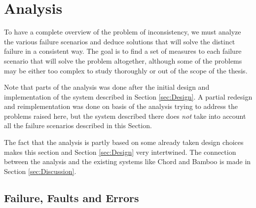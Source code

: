 \section{Analysis}
\label{sec:Analysis}


To have a complete overview of the problem of inconsistency, we must analyze the
 various failure scenarios and deduce solutions that will solve the distinct failure
 in a consistent way. The goal is to find a set of measures to each failure scenario
 that will solve the problem altogether, although some of the problems may be either
 too complex to study thoroughly or out of the scope of the thesis.

Note that parts of the analysis was done after the initial design and implementation
 of the system described in Section \ref{sec:Design}. A partial redesign and reimplementation
 was done on basis of the analysis trying to address the problems raised here, but the
 system described there does \emph{not} take into account all the failure scenarios
 described in this Section.

The fact that the analysis is partly based on some already taken design choices makes
 this section and Section \ref{sec:Design} very intertwined. The connection between the
 analysis and the existing systems like Chord and Bamboo is made in Section
 \ref{sec:Discussion}.

\subsection{Failure, Faults and Errors}
\label{analysis:Failure}

